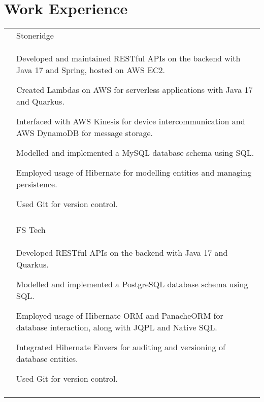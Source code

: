 \documentclass[a4paper,12pt]{article}
\begin{document}
\section{Work Experience}
\begin{longtable}{r|p{14.3cm}}

& Stoneridge \\*
&\footnotesize{
\begin{itemize*}[label=\Large\textbullet]
    \item Developed and maintained RESTful APIs on the backend with Java 17 and Spring, hosted on AWS EC2.
    \item Created Lambdas on AWS for serverless applications with Java 17 and Quarkus.
    \item Interfaced with AWS Kinesis for device intercommunication and AWS DynamoDB for \mbox{message} storage.
    \item Modelled and implemented a MySQL database schema using SQL.
    \item \mbox{Employed} usage of Hibernate for modelling entities and managing persistence.
    \item Used Git for version control.
    \end{itemize*}
}
\\ \\

 & FS Tech \\*
 &\footnotesize{
    \begin{itemize*}[label=\Large\textbullet]
        \item Developed RESTful APIs on the backend with Java 17 and Quarkus.
        \item Modelled and \mbox{implemented} a PostgreSQL database schema using SQL.
        \item Employed usage of Hibernate ORM and PanacheORM for database interaction, along with JQPL and Native SQL.
        \item \mbox{Integrated} Hibernate Envers for auditing and versioning of database entities.
        \item Used Git for version control.
     \end{itemize*}
 }
 \\ \\



\end{longtable}
\end{document}
